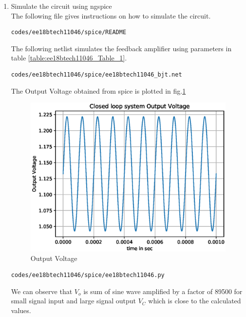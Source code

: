 \begin{enumerate}[label=\arabic*.,ref=\theenumi]
\item Simulate the circuit using ngspice
\\
\solution
The following file gives instructions on how to simulate the circuit.
\begin{lstlisting}
codes/ee18btech11046/spice/README
\end{lstlisting}

The following netlist simulates the feedback amplifier using parameters in table \ref{table:ee18btech11046_Table_1}.
\begin{lstlisting}
codes/ee18btech11046/spice/ee18btech11046_bjt.net
\end{lstlisting}

The Output Voltage obtained from spice is plotted in fig.\ref{fig:ee18btech11046_spice}
%
\begin{figure}[!ht]
\centering
\includegraphics[width=\columnwidth]{./figs/ee18btech11046/ee18btech11046.eps}
\caption{Output Voltage}
\label{fig:ee18btech11046_spice}
\end{figure}
%

\begin{lstlisting}
codes/ee18btech11046/spice/ee18btech11046.py
\end{lstlisting}
We can observe that $V_{o}$ is sum of sine wave amplified by a factor of 89500 for small signal input and large signal output $V_{C}$ which is close to the calculated values.














\end{enumerate}
